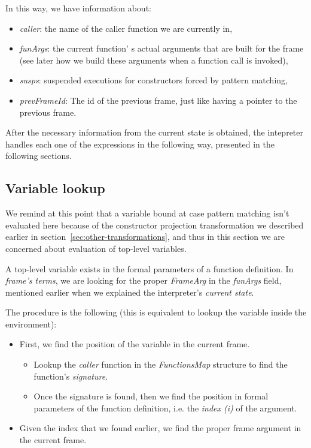 \documentclass[diploma]{softlab-thesis}
\begin{document}
In this way, we have information about:
\begin{itemize}
  \item \textit{caller}: the name of the caller function we are currently in,
  \item \textit{funArgs}: the current function' s actual arguments that are built for the frame (see later how we build these 
  arguments when a function call is invoked), 
  \item \textit{susps}: suspended executions for constructors forced by pattern matching, 
  \item \textit{prevFrameId}: The id of the previous frame, just like having a pointer to the previous frame.
\end{itemize}

After the necessary information from the current state is obtained, the intepreter handles each one of the expressions
in the following way, presented in the following sections.

\subsection{Variable lookup}

We remind at this point that a variable bound at case pattern matching isn't evaluated here because of the constructor 
projection transformation we described earlier in section~\ref{sec:other-transformations}, and thus in this section we are concerned about evaluation 
of top-level variables. 

A top-level variable exists in the formal parameters of a function definition. In \textit{frame's terms}, 
we are looking for the proper \textit{FrameArg} in the \textit{funArgs} field, mentioned earlier when we explained 
the interpreter's \textit{current state}.

The procedure is the following (this is equivalent to lookup the variable inside the environment):
\begin{itemize}
  \item First, we find the position of the variable in the current frame.
  \begin{itemize}
    \item Lookup the \textit{caller} function in the \textit{FunctionsMap} structure to find the function's 
    \textit{signature}.
    \item Once the signature is found, then we find the position in formal parameters of the function definition, 
    i.e. the \textit{index (i)} of the argument.
  \end{itemize} 
  \item Given the index that we found earlier, we find the proper frame argument in the current frame. 
\end{itemize}
\end{document}
